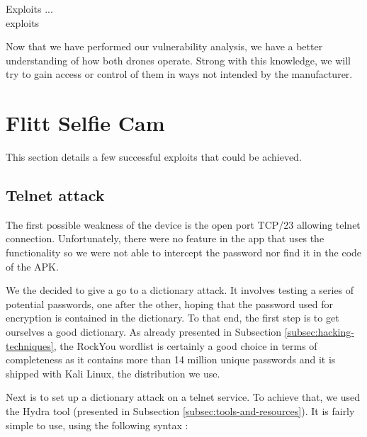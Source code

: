 \begin{chaptercover}{Exploits}%
{
{\large \hyphenation{} \bigletter{}{} {\color{red} ...}\newline\\}}%
{exploits}

Now that we have performed our vulnerability analysis, we have a better understanding of how both drones operate. Strong with this knowledge, we will try to gain access or control of them in ways not intended by the manufacturer.


\section{Flitt Selfie Cam}

This section details a few successful exploits that could be achieved.

\subsection{Telnet attack}

The first possible weakness of the device is the open port TCP/23 allowing telnet connection. Unfortunately, there were no feature in the app that uses the functionality so we were not able to intercept the password nor find it in the code of the APK.

We the decided to give a go to a dictionary attack. It involves testing a series of potential passwords, one after the other, hoping that the password used for encryption is contained in the dictionary. To that end, the first step is to get ourselves a good dictionary. As already presented in Subsection \ref{subsec:hacking-techniques}, the RockYou wordlist is certainly a good choice in terms of completeness as it contains more than 14 million unique passwords and it is shipped with Kali Linux, the distribution we use.

Next is to set up a dictionary attack on a telnet service. To achieve that, we used the Hydra tool (presented in Subsection \ref{subsec:tools-and-resources}). It is fairly simple to use, using the following syntax :


\end{chaptercover}
